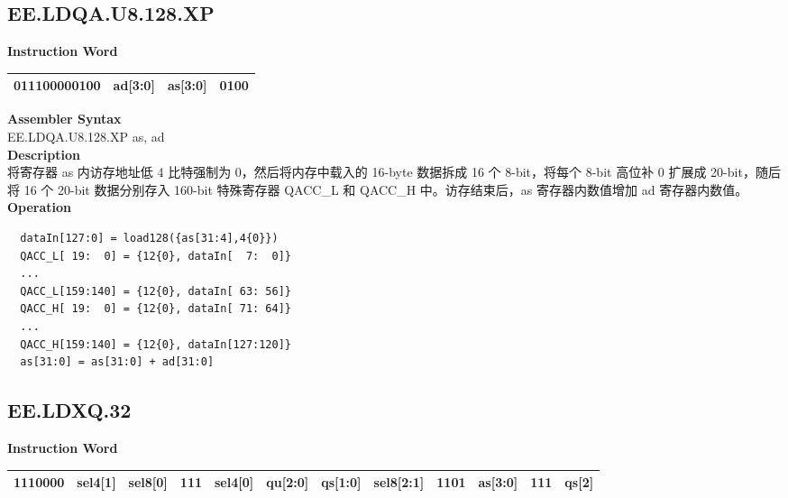 \clearpage
\subsection{EE.LDQA.U8.128.XP}\label{instruction:EELDQAU8128XP}
\setlength\tabcolsep{6pt}
\textbf{Instruction Word} \\
\begin{tabular}{|c|c|c|c|}
	\hline
	011100000100 & ad[3:0] & as[3:0] & 0100 \\
	\hline
\end{tabular}

\textbf{Assembler Syntax} \\
EE.LDQA.U8.128.XP as, ad \\
\textbf{Description} \\
将寄存器 as 内访存地址低 4 比特强制为 0，然后将内存中载入的 16-byte 数据拆成 16 个 8-bit，将每个 8-bit 高位补 0 扩展成 20-bit，随后将 16 个 20-bit 数据分别存入 160-bit 特殊寄存器 QACC\_L 和 QACC\_H 中。访存结束后，as 寄存器内数值增加 ad 寄存器内数值。\\
\textbf{Operation}
\begin{lstlisting}
  dataIn[127:0] = load128({as[31:4],4{0}})
  QACC_L[ 19:  0] = {12{0}, dataIn[  7:  0]}
  ...
  QACC_L[159:140] = {12{0}, dataIn[ 63: 56]}
  QACC_H[ 19:  0] = {12{0}, dataIn[ 71: 64]}
  ...
  QACC_H[159:140] = {12{0}, dataIn[127:120]}
  as[31:0] = as[31:0] + ad[31:0]
\end{lstlisting}

\clearpage
\subsection{EE.LDXQ.32}\label{instruction:EELDXQ32}
\setlength\tabcolsep{6pt}
\textbf{Instruction Word} \\
\begin{tabular}{|c|c|c|c|c|c|c|c|c|c|c|c|}
	\hline
	1110000 & sel4[1] & sel8[0] & 111 & sel4[0] & qu[2:0] & qs[1:0] & sel8[2:1] & 1101 & as[3:0] & 111 & qs[2] \\
	\hline
\end{tabular}

